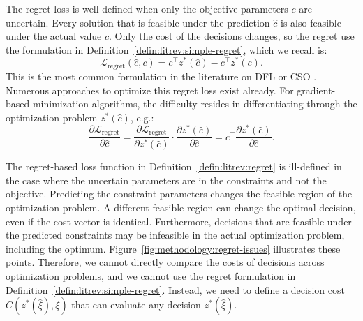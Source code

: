 The regret loss is well defined when only the objective parameters $c$ are uncertain. Every solution that is feasible under the prediction $\hat{c}$ is also feasible under the actual value $c$. Only the cost of the decisions changes, so the regret use the formulation in Definition~\ref{defin:litrev:simple-regret}, which we recall is:
\begin{equation*}
    \mathcal{L}_\text{regret}(\hat{c}, c) = c^\top z^*(\hat{c}) - c^\top z^*(c).
\end{equation*}
This is the most common formulation in the literature on DFL or CSO \citep{sadanaSurveyContextualOptimization2023, sunMaximumOptimalityMargin2023, elmachtoubSmartPredictThen2022, kotaryEndtoEndConstrainedOptimization2021}. Numerous approaches to optimize this regret loss exist already. For gradient-based minimization algorithms, the difficulty resides in differentiating through the optimization problem $z^*(\hat{c})$, e.g.:
\begin{equation}
    \dfrac{\partial \mathcal{L}_\text{regret}}{\partial \hat{c}} = \dfrac{\partial \mathcal{L}_\text{regret}}{\partial z^*(\hat{c})} \cdot \dfrac{\partial z^*(\hat{c})}{\partial \hat{c}} = c^\top \dfrac{\partial z^*(\hat{c})}{\partial \hat{c}}.
\end{equation}

The regret-based loss function in Definition~\ref{defin:litrev:regret} is ill-defined in the case where the uncertain parameters are in the constraints and not the objective. Predicting the constraint parameters changes the feasible region of the optimization problem. A different feasible region can change the optimal decision, even if the cost vector is identical. Furthermore, decisions that are feasible under the predicted constraints may be infeasible in the actual optimization problem, including the optimum. Figure~\ref{fig:methodology:regret-issues} illustrates these points. Therefore, we cannot directly compare the costs of decisions across optimization problems, and we cannot use the regret formulation in Definition~\ref{defin:litrev:simple-regret}. Instead, we need to define a decision cost $C(z^*(\hat{\xi}), \xi)$ that can evaluate any decision $z^*(\hat{\xi})$.

